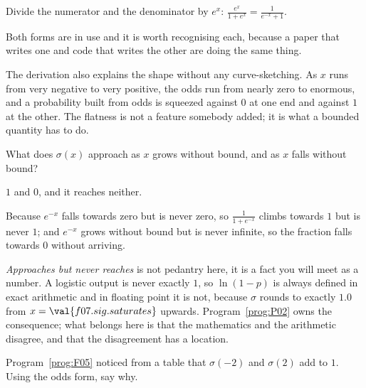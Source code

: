 \begin{fr}
\begin{ansblock}
Divide the numerator and the denominator by $e^{x}$:
$\frac{e^{x}}{1 + e^{x}} = \frac{1}{e^{-x} + 1}$.
\end{ansblock}

Both forms are in use and it is worth recognising each, because a paper that
writes one and code that writes the other are doing the same thing.

The derivation also explains the shape without any curve-sketching. As $x$
runs from very negative to very positive, the odds run from nearly zero to
enormous, and a probability built from odds is squeezed against $0$ at one end
and against $1$ at the other. The flatness is not a feature somebody added; it
is what a bounded quantity has to do.

What does $\sigma(x)$ approach as $x$ grows without bound, and as $x$ falls
without bound?
\nextframe
\end{fr}

\begin{fr}
\begin{ansblock}
$1$ and $0$, and it reaches neither.
\end{ansblock}

Because $e^{-x}$ falls towards zero but is never zero, so $\frac{1}{1+e^{-x}}$
climbs towards $1$ but is never $1$; and $e^{-x}$ grows without bound but is
never infinite, so the fraction falls towards $0$ without arriving.

\begin{note}
\emph{Approaches but never reaches} is not pedantry here, it is a fact you
will meet as a number. A logistic output is never exactly $1$, so
$\ln(1 - p)$ is always defined in exact arithmetic \dash{} and in floating
point it is not, because $\sigma$ rounds to exactly $\num{1.0}$ from
$x = \val{f07.sig.saturates}$ upwards. Program~\ref{prog:P02} owns the consequence; what belongs
here is that the mathematics and the arithmetic disagree, and that the
disagreement has a location.
\end{note}

Program~\ref{prog:F05} noticed from a table that $\sigma(-2)$ and $\sigma(2)$
add to $1$. Using the odds form, say why.
\nextframe
\end{fr}

